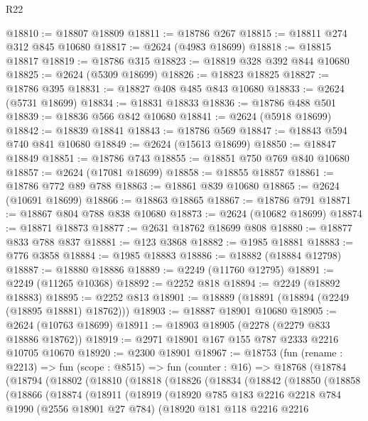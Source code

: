 \begin{lexlean}{R22}
\begin{coremodule}
@18810 := @18807 @18809
@18811 := @18786 @267
@18815 := @18811 @274 @312 @845 @10680
@18817 := @2624 (@4983 @18699)
@18818 := @18815 @18817
@18819 := @18786 @315
@18823 := @18819 @328 @392 @844 @10680
@18825 := @2624 (@5309 @18699)
@18826 := @18823 @18825
@18827 := @18786 @395
@18831 := @18827 @408 @485 @843 @10680
@18833 := @2624 (@5731 @18699)
@18834 := @18831 @18833
@18836 := @18786 @488 @501
@18839 := @18836 @566 @842 @10680
@18841 := @2624 (@5918 @18699)
@18842 := @18839 @18841
@18843 := @18786 @569
@18847 := @18843 @594 @740 @841 @10680
@18849 := @2624 (@15613 @18699)
@18850 := @18847 @18849
@18851 := @18786 @743
@18855 := @18851 @750 @769 @840 @10680
@18857 := @2624 (@17081 @18699)
@18858 := @18855 @18857
@18861 := @18786 @772 @89 @788
@18863 := @18861 @839 @10680
@18865 := @2624 (@10691 @18699)
@18866 := @18863 @18865
@18867 := @18786 @791
@18871 := @18867 @804 @788 @838 @10680
@18873 := @2624 (@10682 @18699)
@18874 := @18871 @18873
@18877 := @2631 @18762 @18699 @808
@18880 := @18877 @833 @788 @837
@18881 := @123 @3868
@18882 := @1985 @18881
@18883 := @776 @3858
@18884 := @1985 @18883
@18886 := @18882 (@18884 @12798)
@18887 := @18880 @18886
@18889 := @2249 (@11760 @12795)
@18891 := @2249 (@11265 @10368)
@18892 := @2252 @818
@18894 := @2249 (@18892 @18883)
@18895 := @2252 @813
@18901 := @18889 (@18891 (@18894 (@2249 (@18895 @18881) @18762)))
@18903 := @18887 @18901 @10680
@18905 := @2624 (@10763 @18699)
@18911 := @18903 @18905 (@2278 (@2279 @833 @18886 @18762))
@18919 := @2971 @18901 @167 @155 @787 @2333 @2216 @10705 @10670
@18920 := @2300 @18901
@18967 := @18753
    (fun (rename : @2213) =>
    fun (scope : @8515) =>
    fun (counter : @16) =>
    @18768
      (@18784
        (@18794
          (@18802
            (@18810
              (@18818
                (@18826
                  (@18834
                    (@18842
                      (@18850
                        (@18858
                          (@18866
                            (@18874
                              (@18911
                                (@18919
                                  (@18920
                                    @785
                                    @183
                                    @2216
                                    @2218
                                    @784
                                    @1990
                                    (@2556 @18901 @27 @784)
                                    (@18920
                                      @181
                                      @118
                                      @2216
                                      @2216

\end{coremodule}
\end{lexlean}
